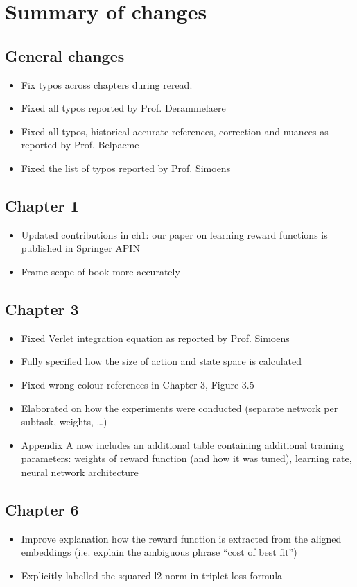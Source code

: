 \documentclass[\home/main.tex]{subfiles}
\begin{document}
\frontmatter
{}

\chapter*{Summary of changes}
\section*{General changes}

\begin{itemize}
    \item Fix typos across chapters during reread.
    \item Fixed all typos reported by Prof. Derammelaere
    \item Fixed all typos, historical accurate references, correction and nuances as reported by Prof. Belpaeme
    \item Fixed the list of typos reported by Prof. Simoens
\end{itemize}


\section*{Chapter 1}
\begin{itemize}
    \item Updated contributions in ch1: our paper on learning reward functions is published in Springer APIN
    \item Frame scope of book more accurately
\end{itemize}

\section*{Chapter 3}
\begin{itemize}
    \item Fixed Verlet integration equation as reported by Prof. Simoens
    \item Fully specified how the size of action and state space is calculated
    \item Fixed wrong colour references in Chapter 3, Figure 3.5
    \item Elaborated on how the experiments were conducted (separate network per subtask, weights, \ldots)
    \item Appendix A now includes an additional table containing additional training parameters: weights of reward function (and how it was tuned), learning rate, neural network architecture

\end{itemize}

\section*{Chapter 6}
\begin{itemize}
    \item Improve explanation how the reward function is extracted from the aligned embeddings (i.e. explain the ambiguous phrase \enquote{cost of best fit})
    \item Explicitly labelled the squared l2 norm in triplet loss formula
\end{itemize}
\mainmatter 
\backmatter
\end{document}
